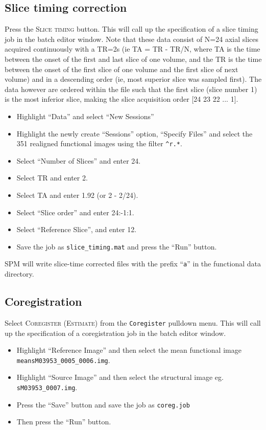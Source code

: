 \subsection{Slice timing correction}

Press the \textsc{Slice timing} button. This will call up the specification of a slice timing job in the batch editor window. Note that these data consist of N=24 axial slices acquired continuously with a TR=2s (ie TA = TR - TR/N, where TA is the time between the onset of the first and last slice of one volume, and the TR is the time between the onset of the first slice of one volume and the first slice of next volume) and in a descending order (ie, most superior slice was sampled first). The data however are ordered within the file such that the first slice (slice number 1) is the most inferior slice, making the slice acquisition order [24 23 22 ... 1].

\begin{itemize}
\item Highlight ``Data'' and select ``New Sessions''
\item Highlight the newly create ``Sessions'' option, ``Specify Files'' and select the 351 realigned functional images using the filter \texttt{\textasciicircum r.*}.
\item Select ``Number of Slices'' and enter 24.
\item Select TR and enter 2.
\item Select TA and enter 1.92 (or 2 - 2/24).
\item Select ``Slice order'' and enter 24:-1:1.
\item Select ``Reference Slice'', and enter 12.
\item Save the job as \texttt{slice\_timing.mat} and press the ``Run'' button.
\end{itemize}
SPM will write slice-time corrected files with the prefix ``\texttt{a}'' in the functional data directory.

\subsection{Coregistration}

Select \textsc{Coregister (Estimate)} from the \texttt{Coregister} pulldown menu. This will call up the specification of a coregistration job in the batch editor 
window. 

\begin{itemize}
\item Highlight ``Reference Image'' and then select the mean functional image \texttt{meansM03953\_0005\_0006.img}.
\item Highlight ``Source Image'' and then select the structural image eg. \texttt{sM03953\_0007.img}.
\item Press the ``Save'' button and save the job as \texttt{coreg.job}
\item Then press the ``Run'' button.
\end{itemize}

